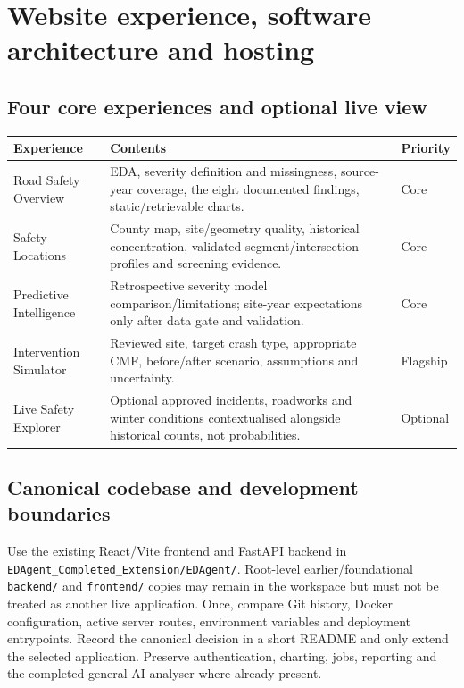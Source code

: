\documentclass[11pt,a4paper,openany]{report}
\newcommand{\pathcode}[1]{\nolinkurl{#1}}
\begin{document}
\chapter{Website experience, software architecture and hosting}
\section{Four core experiences and optional live view}
\small
\begin{tabularx}{\linewidth}{@{}L{38mm}Y L{19mm}@{}}\toprule
Experience & Contents & Priority\\\midrule
Road Safety Overview & EDA, severity definition and missingness, source-year coverage, the eight documented findings, static/retrievable charts. & Core\\
Safety Locations & County map, site/geometry quality, historical concentration, validated segment/intersection profiles and screening evidence. & Core\\
Predictive Intelligence & Retrospective severity model comparison/limitations; site-year expectations only after data gate and validation. & Core\\
Intervention Simulator & Reviewed site, target crash type, appropriate CMF, before/after scenario, assumptions and uncertainty. & Flagship\\
Live Safety Explorer & Optional approved incidents, roadworks and winter conditions contextualised alongside historical counts, not probabilities. & Optional\\
\bottomrule\end{tabularx}
\normalsize

\section{Canonical codebase and development boundaries}
Use the existing React/Vite frontend and FastAPI backend in \pathcode{EDAgent_Completed_Extension/EDAgent/}. Root-level earlier/foundational \pathcode{backend/} and \pathcode{frontend/} copies may remain in the workspace but must not be treated as another live application. Once, compare Git history, Docker configuration, active server routes, environment variables and deployment entrypoints. Record the canonical decision in a short README and only extend the selected application. Preserve authentication, charting, jobs, reporting and the completed general AI analyser where already present.
\end{document}
